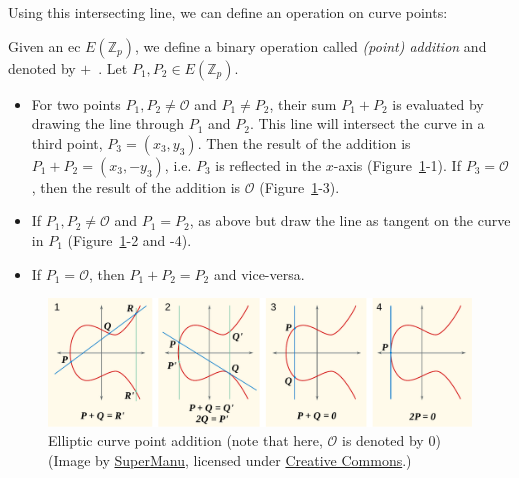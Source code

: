 Using this intersecting line, we can define an operation on curve points:
\begin{definition}
    \label{def:point-add}
    Given an \gls{ec} $E(\mathbb{Z}_p)$, we define a binary operation called \emph{(point) addition} and denoted by $+$~\cite{katz_introduction_2015}. Let $P_1, P_2 \in E(\mathbb{Z}_p)$.
    \begin{itemize}
        \item For two points $P_1, P_2 \neq \mathcal{O}$ and $P_1 \neq P_2$, their sum $P_1 + P_2$ is evaluated by drawing the line through $P_1$ and $P_2$. 
            This line will intersect the curve in a third point, $P_3 = (x_3, y_3)$.
            Then the result of the addition is $P_1 + P_2 = (x_3, -y_3)$, i.e. $P_3$ is reflected in the $x$-axis (Figure~\ref{fig:ecc-point-addition}-1).
            If $P_3 = \mathcal{O}$, then the result of the addition is $\mathcal{O}$ (Figure~\ref{fig:ecc-point-addition}-3).
        \item If $P_1, P_2 \neq \mathcal{O}$ and $P_1 = P_2$, as above but draw the line as tangent on the curve in $P_1$ (Figure~\ref{fig:ecc-point-addition}-2 and -4).
        \item If $P_1 = \mathcal{O}$, then $P_1 + P_2 = P_2$ and vice-versa.
    \end{itemize}
\end{definition} 

\begin{figure}
    \includegraphics[width=\textwidth]{figures/ecc_point_addition.pdf}
    \caption[Elliptic curve point addition]{Elliptic curve point addition (note that here, $\mathcal{O}$ is denoted by $0$)\\(Image by \href{https://commons.wikimedia.org/wiki/File:ECClines-2.svg}{SuperManu}, licensed under \href{https://creativecommons.org/licenses/by-sa/3.0/deed.en}{Creative Commons}.)}
    \label{fig:ecc-point-addition}
\end{figure}

